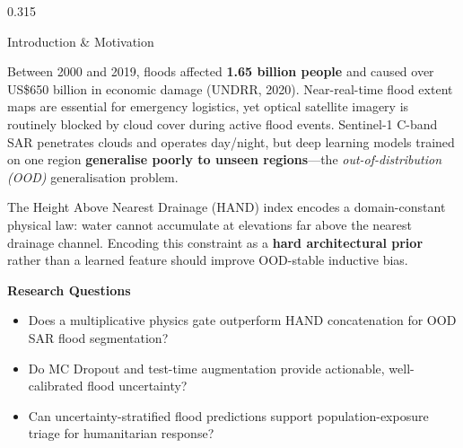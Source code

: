 \documentclass[final]{beamer}
\begin{document}
\begin{frame}[t,fragile]{}
\vspace{1.0cm}

\begin{columns}[T]

\begin{column}{0.315\textwidth}
\hspace*{1.6cm}
\begin{minipage}{0.93\textwidth}

\begin{tcolorbox}[sectiontitle]
  \vphantom{Ag} Introduction \& Motivation
\end{tcolorbox}
\vspace{4pt}
\begin{tcolorbox}[posterbox]
Between 2000 and 2019, floods affected \textbf{1.65 billion people} and caused
over US\$650 billion in economic damage (UNDRR, 2020). Near-real-time flood extent
maps are essential for emergency logistics, yet optical satellite imagery is routinely
blocked by cloud cover during active flood events. Sentinel-1 C-band SAR penetrates
clouds and operates day/night, but deep learning models trained on one region
\textbf{generalise poorly to unseen regions}—the \textit{out-of-distribution (OOD)}
generalisation problem.

\vspace{6pt}
The Height Above Nearest Drainage (HAND) index encodes a domain-constant physical
law: water cannot accumulate at elevations far above the nearest drainage channel.
Encoding this constraint as a \textbf{hard architectural prior} rather than a learned
feature should improve OOD-stable inductive bias.

\vspace{8pt}
\textbf{Research Questions}
\begin{itemize}[leftmargin=1.4em,itemsep=2pt,topsep=2pt]
  \item[\color{dkuTeal}\textbf{RQ1.}]
    Does a multiplicative physics gate outperform HAND concatenation for
    OOD SAR flood segmentation?
  \item[\color{dkuTeal}\textbf{RQ2.}]
    Do MC Dropout and test-time augmentation provide actionable, well-calibrated
    flood uncertainty?
  \item[\color{dkuTeal}\textbf{RQ3.}]
    Can uncertainty-stratified flood predictions support population-exposure
    triage for humanitarian response?
\end{itemize}


\end{tcolorbox}
\end{minipage}
\end{column}
\end{columns}
\end{frame}
\end{document}
